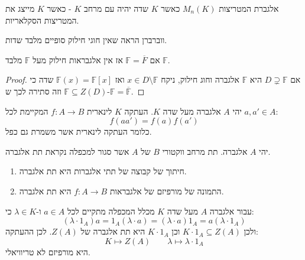 \documentclass{tstextbook}
\begin{document}
\begin{example}
אלגברת המטריצות \(M_{n}(K)\) כאשר \(K\) שדה יהיה עם מרחב \(K\) - כאשר \(K\) מייצג את המטריצות הסקלאריות.

\end{example}
\begin{reminder}
ווברברן הראה שאין חוגי חילוק סופיים מלבד שדות.

\end{reminder}
\begin{proposition}
אם \(\mathbb{F}=\overline{F}\) אז אין אלגבראות חילוק מעל \(\mathbb{F}\) מלבד \(\mathbb{F}\).

\end{proposition}
\begin{proof}
אם \(D\supsetneq \mathbb{F}\) היא \(\mathbb{F}\) אלגברה וחוג חילוק, ניקח \(x \in D \setminus \mathbb{F}\) ואז \(\mathbb{F}(x)=\mathbb{F}[x]\) שדה כי \(\mathbb{F}\subseteq Z(D)\) וזה סתירה לכך ש-\(\mathbb{F}=\overline{\mathbb{F}}\). 

\end{proof}
\begin{definition}
יהי \(A\) אלגברה מעל שדה \(K\). העתקה \(K\) לינארית \(f:A\to B\) המקיימת לכל \(a,a' \in A\):
$$f(aa')=f(a)f(a')$$
כלומר העתקה לינארית אשר משמרת גם כפל.

\end{definition}
\begin{definition}[תת אלגברה]
יהי \(A\) אלגברה. תת מרחב ווקטורי \(B\) של \(A\) אשר סגור למכפלה נקראת תת אלגברה.

\end{definition}
\begin{proposition}
  \begin{enumerate}
    \item חיתוך של קבוצה של תתי אלגברות היא תת אלגברה. 


    \item התמונה של מורפיזם של אלגבראות \(f:A\to B\) היא תת אלגברה. 


  \end{enumerate}
\end{proposition}
\begin{example}
עבור אלגברה \(A\) מעל שדה \(K\) מכלל המכפלה מתקיים לכל \(a \in A\) ו-\(\lambda \in K\) כי:
$$(\lambda{\cdot}1_{A})a=1_{A}(\lambda{\cdot}a)=(\lambda{\cdot}a)1_{A}=a(\lambda{\cdot}1_{A})$$
ולכן \(K\cdot 1_{A}\subseteq Z(A)\) וכן \(K\cdot 1_{A}\) היא תת אלגברה של \(Z(A)\). לכן ההעתקה:
$$K\mapsto Z(A)\qquad \lambda \mapsto \lambda \cdot 1_{A}$$
היא מורפיזם לא טריוויאלי.

\end{example}
\end{document}
